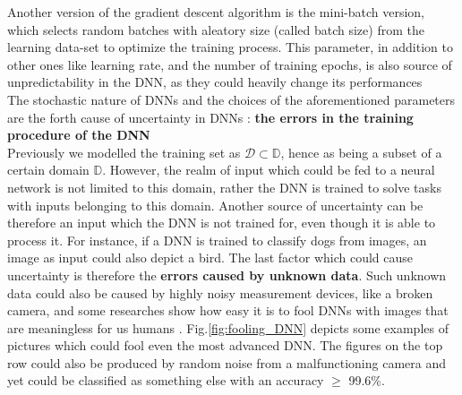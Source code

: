 Another version of the gradient descent algorithm is the mini-batch version, which selects random batches with aleatory size (called batch size) from the learning data-set to optimize the training process. \cite{ruder2017overview} This parameter, in addition to other ones like learning rate, and the number of training epochs, is also source of unpredictability in the DNN, as they could heavily change its performances  \\
The stochastic nature of DNNs and the choices of the aforementioned parameters are the forth cause of uncertainty in DNNs : \textbf{the errors in the training procedure of the DNN}\\
Previously we modelled the training set as $\mathcal{D} \subset \mathbb{D}$, hence as being a subset of a certain domain $\mathbb{D}$. However, the realm of input which could be fed to a neural network is not limited to this domain, rather the DNN is trained to solve tasks with inputs belonging to this domain. Another source of uncertainty can be therefore an input which the DNN is not trained for, even though it is able to process it. For instance, if a DNN is trained to classify dogs from images, an image as input could also depict a bird. The last factor which could cause uncertainty is therefore the \textbf{errors caused by unknown data}. Such unknown data could also be caused by highly noisy measurement devices, like a broken camera, and some researches show how easy it is to fool DNNs with images that are meaningless for us humans \cite{nguyen2015deep}. Fig.\ref{fig:fooling_DNN} depicts some examples of pictures which could fool even the most advanced DNN. The figures on the top row could also be produced by random noise from a malfunctioning camera and yet could be classified as something else with an accuracy $\geq$ 99.6\%. \cite{nguyen2015deep}\\

